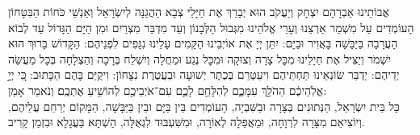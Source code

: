 \documentclass[a4paper, twoside, openany, parskip=half, 10pt]{article}
\begin{document}
אֲבוֹתֵינוּ אַבְרָהָם יִצְחָק וְיַעֲקֹב הוּא יְבָרֵךְ אֶת חַיָּלֵי צְבָא הַהֲגַנָּה לְיִשְׂרָאֵל וְאַנְשֵׁי כֹּחוֹת הַבִּטָּחוֹן הָעוֹמְדִים עַל מִשְׁמַר אַרְצֵנוּ וְעָרֵי אֱלֹהֵינוּ מִגְּבוּל הַלְּבָנוֹן וְעַד מִדְבַּר מִצְרַיִם וּמִן הַיָּם הַגָּדוֹל עַד לְבוֹא הָעֲרָבָה בַּיַּבָּשָׁה בָּאֲוִיר וּבַיָּם:
    יִתֵּן יְיָ אֶת אוֹיְבֵינוּ הַקָּמִים עָלֵינוּ נִגָּפִים לִפְנֵיהֶם: הַקָּדוֹשׁ בָּרוּךְ הוּא יִשְׁמֹר וְיַצִּיל אֶת חַיָלֵינוּ מִכׇּל צָרָה וְצוּקָה וּמִכׇּל נֶגַע וּמַחֲלָה וְיִשְׁלַח בְּרָכָה וְהַצְלָחָה בְּכָל מַעֲשֵׂה יְדֵיהֶם: יַדְבֵּר שׂוֹנְאֵינוּ תַּחְתֵּיהֶם וִיעַטְּרֵם בְּכֶתֶר יְשׁוּעָה וּבְעֲטֶרֶת נִצָּחוֹן: וִיקֻיַּם בָּהֶם הַכָּתוּב: כִּ֚י יְיָ֣ אֱלֹֽהֵיכֶ֔ם הַהֹלֵ֖ךְ עִמָּכֶ֑ם לְהִלָּחֵ֥ם לָכֶ֛ם עִם־אֹיְבֵיכֶ֖ם לְהוֹשִׁ֥יעַ אֶתְכֶֽם׃ 
 וְנֹאמַר אָמֵן:\\
 
  כָּל בֵּית יִשְׂרָאֵל, הַנְּתוּנִים בְּצָרָה וּבַשִּׁבְיָה, הָעוֹמְדִים בֵּין בַּיָּם וּבֵין בַּיַּבָּשָׁה, הַמָּקוֹם יְרַחֵם עֲלֵיהֶם, וְיוֹצִיאֵם מִצָּרָה לִרְוָחָה, וּמֵאֲפֵלָה לְאוֹרָה, וּמִשִּׁעְבּוּד לִגְאֻלָּה, הַשְׁתָּא בַּעֲגָלָא וּבִזְמַן קָרִיב.



\vfill

\end{document}
